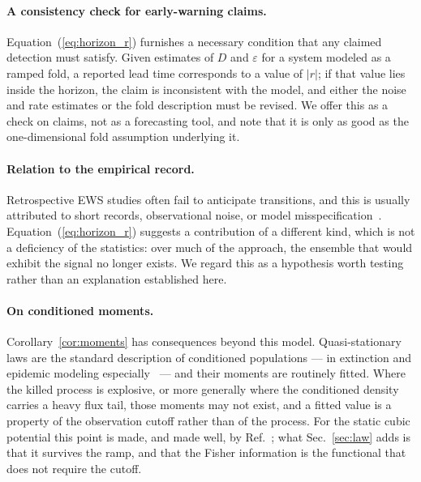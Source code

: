 \documentclass[%
 twocolumn,
 superscriptaddress,
 amsmath,amssymb,
 aps,
 pre,
 floatfix,
]{revtex4-2}
\begin{document}
\paragraph{A consistency check for early-warning claims.}
Equation~(\ref{eq:horizon_r}) furnishes a necessary condition that any claimed detection must satisfy.  Given estimates of $D$ and $\varepsilon$ for a system modeled as a ramped fold, a reported lead time corresponds to a value of $|r|$; if that value lies inside the horizon, the claim is inconsistent with the model, and either the noise and rate estimates or the fold description must be revised.  We offer this as a check on claims, not as a forecasting tool, and note that it is only as good as the one-dimensional fold assumption underlying it.

\paragraph{Relation to the empirical record.}
Retrospective EWS studies often fail to anticipate transitions, and this is usually attributed to short records, observational noise, or model misspecification~\cite{Dakos2024,Boettiger2012}.  Equation~(\ref{eq:horizon_r}) suggests a contribution of a different kind, which is not a deficiency of the statistics: over much of the approach, the ensemble that would exhibit the signal no longer exists.  We regard this as a hypothesis worth testing rather than an explanation established here.

\paragraph{On conditioned moments.}
Corollary~\ref{cor:moments} has consequences beyond this model.  Quasi-stationary laws are the standard description of conditioned populations --- in extinction and epidemic modeling especially~\cite{MeleardVillemonais2012,Collet2013} --- and their moments are routinely fitted.  Where the killed process is explosive, or more generally where the conditioned density carries a heavy flux tail, those moments may not exist, and a fitted value is a property of the observation cutoff rather than of the process.  For the static cubic potential this point is made, and made well, by Ref.~\cite{Ornigotti2018}; what Sec.~\ref{sec:law} adds is that it survives the ramp, and that the Fisher information is the functional that does not require the cutoff.
\end{document}
